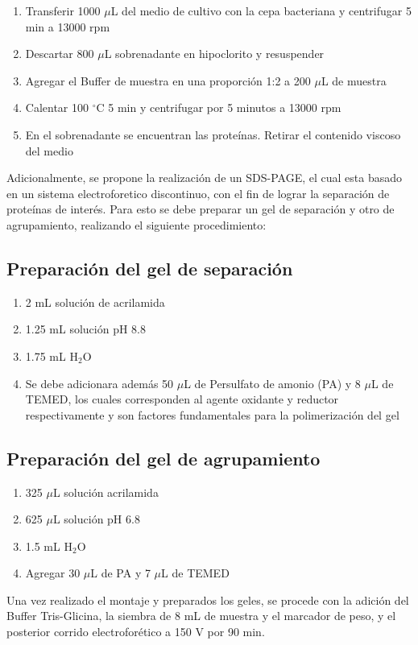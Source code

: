 \documentclass[12pt]{article}
\begin{document}
	\begin{enumerate}
		\item Transferir 1000 $\mu$L del medio de cultivo con la cepa bacteriana y centrifugar 5 min a 13000 rpm
		\item Descartar 800 $\mu$L sobrenadante en hipoclorito y resuspender 
		\item Agregar el Buffer de muestra en una proporción 1:2 a 200 $\mu$L de muestra
		\item Calentar 100 $^\circ$C 5 min y centrifugar por 5 minutos a 13000 rpm 
		\item En el sobrenadante se encuentran las proteínas. Retirar el contenido viscoso del medio
	\end{enumerate}
	
	Adicionalmente, se propone la realización de un SDS-PAGE, el cual esta basado en un sistema electroforetico discontinuo, con el fin de lograr la separación de proteínas de interés. Para esto se debe preparar un gel de separación y otro de agrupamiento, realizando el siguiente procedimiento:
	
	\subsection{Preparación del gel de separación}
	\begin{enumerate}
		\item 2 mL solución de acrilamida
		\item 1.25 mL solución pH 8.8
		\item 1.75 mL H$_2$O
		\item Se debe adicionara además 50 $\mu$L de Persulfato de amonio (PA) y 8 $\mu$L de TEMED, los cuales corresponden al agente oxidante y reductor respectivamente y son factores fundamentales para la polimerización del gel
	\end{enumerate}
	
	\subsection{Preparación del gel de agrupamiento}
	\begin{enumerate}
		\item 325 $\mu$L soluci\'on acrilamida
		\item 625 $\mu$L soluci\'on pH 6.8
		\item 1.5 mL H$_2$O
		\item Agregar 30 $\mu$L de PA y 7 $\mu$L de TEMED
	\end{enumerate}
	
	Una vez realizado el montaje y preparados los geles, se procede con la adición del Buffer Tris-Glicina, la siembra de 8 mL de muestra y el marcador de peso, y el posterior corrido electroforético a 150 V por 90 min.
	
	\newpage
	\printbibliography[heading=bibintoc, title={Referencias}]
%	
\end{document}
